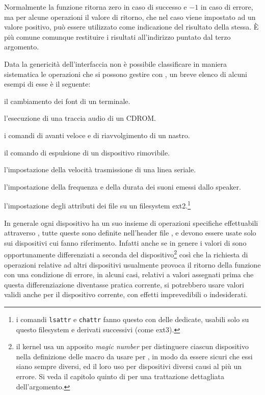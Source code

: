 Normalmente la funzione ritorna zero in caso di successo e $-1$ in caso di
errore, ma per alcune operazioni il valore di ritorno, che nel caso viene
impostato ad un valore positivo, può essere utilizzato come indicazione del
risultato della stessa. È più comune comunque restituire i risultati
all'indirizzo puntato dal terzo argomento.

Data la genericità dell'interfaccia non è possibile classificare in maniera
sistematica le operazioni che si possono gestire con , un breve
elenco di alcuni esempi di esse è il seguente:
\begin{itemize*}
\item il cambiamento dei font di un terminale.
\item l'esecuzione di una traccia audio di un CDROM.
\item i comandi di avanti veloce e di riavvolgimento di un nastro.
\item il comando di espulsione di un dispositivo rimovibile.
\item l'impostazione della velocità trasmissione di una linea seriale.
\item l'impostazione della frequenza e della durata dei suoni emessi dallo
  speaker.
\item l'impostazione degli attributi dei file su un filesystem
  ext2.\footnote{i comandi \texttt{lsattr} e \texttt{chattr} fanno questo con
    delle  dedicate, usabili solo su questo filesystem e derivati
    successivi (come ext3).}
\end{itemize*}

In generale ogni dispositivo ha un suo insieme di operazioni specifiche
effettuabili attraverso , tutte queste sono definite nell'header
file , e devono essere usate solo sui dispositivi cui
fanno riferimento. Infatti anche se in genere i valori di  sono
opportunamente differenziati a seconda del dispositivo\footnote{il kernel usa
  un apposito \textit{magic number} per distinguere ciascun dispositivo nella
  definizione delle macro da usare per , in modo da essere
  sicuri che essi siano sempre diversi, ed il loro uso per dispositivi diversi
  causi al più un errore.  Si veda il capitolo quinto di \cite{LinDevDri} per
  una trattazione dettagliata dell'argomento.} così che la richiesta di
operazioni relative ad altri dispositivi usualmente provoca il ritorno della
funzione con una condizione di errore, in alcuni casi, relativi a valori
assegnati prima che questa differenziazione diventasse pratica corrente, si
potrebbero usare valori validi anche per il dispositivo corrente, con effetti
imprevedibili o indesiderati.

